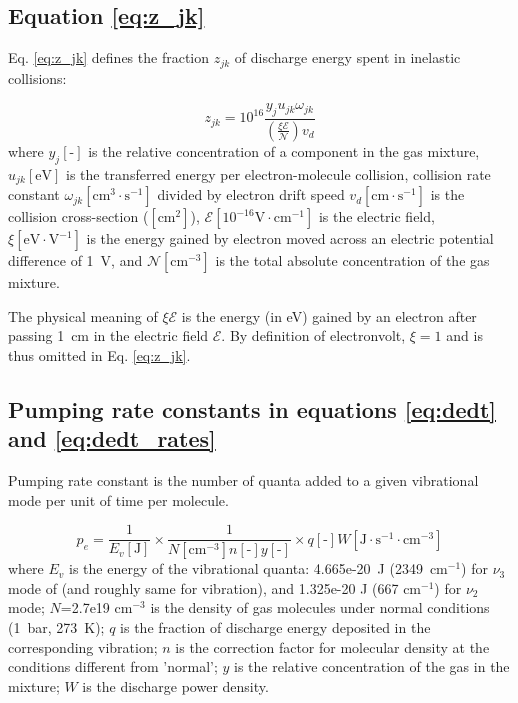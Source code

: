 \documentclass{report}
\begin{document}
\begin{appendices}
\subsection*{Equation \ref{eq:z_jk}}

Eq. \ref{eq:z_jk} defines the fraction $z_{jk}$ of discharge energy spent in inelastic collisions:

\begin{equation*}
z_{jk} = 10^{16} \frac{y_j u_{jk} \omega _{jk}} {\left( \frac{\xi\mathcal{E}}{\mathcal{N}} \right) v_d}  
\end{equation*}
where $y_j[\text{-}]$ is the relative concentration of a component in the gas mixture, $u_{jk}[\text{eV}]$ is the transferred energy per electron-molecule collision, collision rate constant $\omega _{jk}[\text{cm}^3\cdot\text{s}^{-1}]$ divided by electron drift speed $v_d[\text{cm}\cdot\text{s}^{-1}]$ is the collision cross-section ($[\text{cm}^2]$), $\mathcal{E}[10^{-16}\text{V}\cdot\text{cm}^{-1}]$ is the electric field, $\xi[\text{eV}\cdot\text{V}^{-1}]$ is the energy gained by electron moved across an electric potential difference of 1~V,  and $\mathcal{N}[\text{cm}^{-3}]$ is the total absolute concentration of the gas mixture.

The physical meaning of $\xi\mathcal{E}$ is the energy (in eV) gained by an electron after passing 1~cm in the electric field $\mathcal{E}$. By definition of electronvolt, $\xi = 1$ and is thus omitted in Eq. \ref{eq:z_jk}.



\subsection*{Pumping rate constants in equations \ref{eq:dedt} and \ref{eq:dedt_rates}}

Pumping rate constant is the number of quanta added to a given vibrational mode per unit of time per molecule.

\begin{equation*}
p_e = \frac{1}{E_v[\text{J}]} \times \frac{1}{N[\text{cm}^{-3}] n[\text{-}] y[\text{-}]} \times q[\text{-}] W[\text{J}\cdot \text{s}^{-1} \cdot \text{cm}^{-3}]
\end{equation*}
where $E_v$ is the energy of the vibrational quanta: 4.665e-20~J (2349~{cm$^{-1}$}) for $\nu_3$ mode of  (and roughly same for  vibration), and  1.325e-20 J (667 {cm$^{-1}$}) for $\nu_2$ mode; $N$=2.7e19 {cm$^{-3}$} is the density of gas molecules under normal conditions (1~bar, 273~K); $q$ is the fraction of discharge energy deposited in the corresponding vibration; $n$ is the correction factor for molecular density at the conditions different from 'normal'; $y$ is the relative concentration of the gas in the mixture; $W$ is the discharge power density.


\end{appendices}
\end{document}
